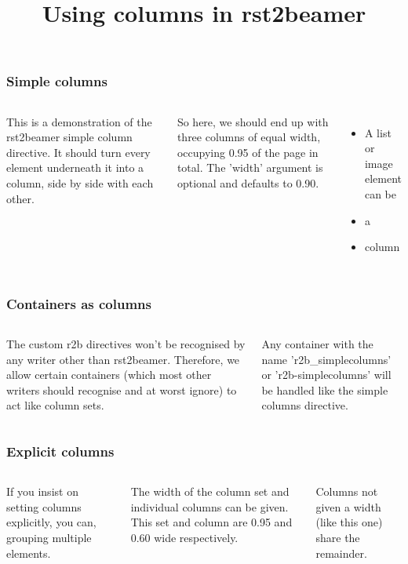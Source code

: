 \documentclass[t,english]{beamer}
\title{Using columns in rst2beamer}
\newlength{\locallinewidth}
\begin{document}
\maketitle

\setlength{\locallinewidth}{\linewidth}

\begin{frame}
\frametitle{Simple columns}

\begin{columns}[T]

This is a demonstration of the rst2beamer simple column directive. It
should turn every element underneath it into a column, side by side with
each other.


So here, we should end up with three columns of equal width, occupying 0.95
of the page in total. The 'width' argument is optional and defaults to
0.90.

\begin{itemize}[<+-| alert@+>]
\item {} 
A list or image element can be

\item {} 
a

\item {} 
column

\end{itemize}

\end{columns}
\end{frame}

\begin{frame}
\frametitle{Containers as columns}

\begin{columns}[T]

The custom r2b directives won't be recognised by any writer other than
rst2beamer. Therefore, we allow certain containers (which most other
writers should recognise and at worst ignore) to act like column sets.


Any container with the name 'r2b{\_}simplecolumns' or 'r2b-simplecolumns' will
be handled like the simple columns directive.

\end{columns}
\end{frame}

\begin{frame}
\frametitle{Explicit columns}

\begin{columns}[T]

If you insist on setting columns explicitly, you can, grouping multiple
elements.

The width of the column set and individual columns can be given. This
set and column are 0.95 and 0.60 wide respectively.


Columns not given a width (like this one) share the remainder.

\end{columns}
\end{frame}
\end{document}
